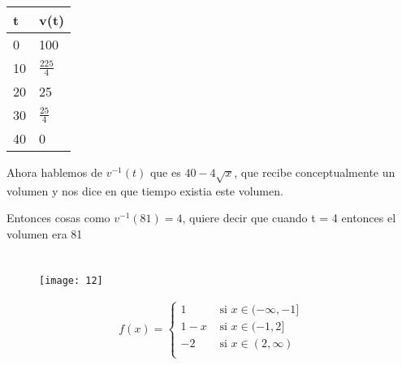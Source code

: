 \documentclass[journal,onecolumn,10pt,fleqn]{IEEEtran}%
\theoremstyle{break}                                            %
\begin{document}
\begin{table}[ht!]
  \begin{tabular}{|l|l|}
  \hline
  t  & v(t) \\ \hline
  0  & 100    \\ \hline
  10 & $\frac{225}{4}$    \\ \hline
  20 & 25    \\ \hline
  30 & $\frac{25}{4}$    \\ \hline
  40 & 0    \\ \hline
  \end{tabular}
\end{table}

Ahora hablemos de $v^{-1}(t)$ que es $40 - 4\sqrt{x}$, que recibe conceptualmente un volumen y nos
dice en que tiempo existia este volumen.

Entonces cosas como $v^{-1}(81) = 4$, quiere decir que cuando t = 4 entonces el volumen era 81

\section{}

\begin{figure}[ht]
  \texttt{[image: 12]}
\end{figure}

\begin{align*}
  f(x) = 
  \begin{cases}
    1 & \text{ si } x \in (-\infty, -1] \\ 
    1 - x & \text{ si } x \in (-1, 2] \\ 
    -2 & \text{ si } x \in (2, \infty) \\ 
  \end{cases}
\end{align*}
\end{document}
